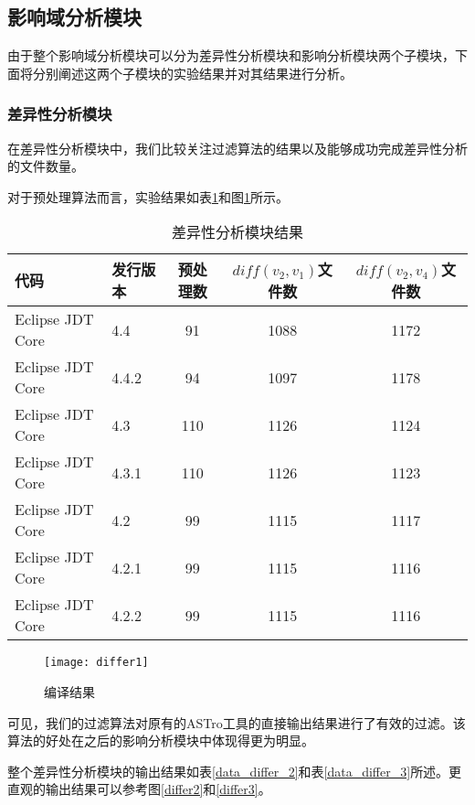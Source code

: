 \subsection{影响域分析模块}

由于整个影响域分析模块可以分为差异性分析模块和影响分析模块两个子模块，下面将分别阐述这两个子模块的实验结果并对其结果进行分析。

\subsubsection{差异性分析模块}

在差异性分析模块中，我们比较关注过滤算法的结果以及能够成功完成差异性分析的文件数量。

对于预处理算法而言，实验结果如表\ref {data_differ_1}和图\ref {differ1}所示。

\begin{table}[H]
	\caption{差异性分析模块结果}
	\label{data_differ_1}
	\centering
	\begin{tabular}{llccc}
		\toprule[1.5pt]
		{\heiti 代码} & {\heiti 发行版本} & {\heiti 预处理数} & {\heiti $diff(v_2,v_1)$文件数} & {\heiti $diff(v_2,v_4)$文件数} \\\midrule[1pt]
		Eclipse JDT Core & 4.4	& 91 & 1088 & 1172	\\		
		Eclipse JDT Core & 4.4.2 & 94 & 1097 & 1178		\\
		Eclipse JDT Core & 4.3 	& 110 & 1126 & 1124			\\
		Eclipse JDT Core & 4.3.1 & 110 & 1126 & 1123			\\
		Eclipse JDT Core & 4.2 	& 99 & 1115 & 1117		\\
		Eclipse JDT Core & 4.2.1 & 99 & 1115 & 1116			\\
		Eclipse JDT Core & 4.2.2 & 99 & 1115 & 1116		\\
		\bottomrule[1.5pt]
	\end{tabular}
\end{table}

\begin{figure}[H]
	\centering
	\texttt{[image: differ1]}
	\caption {编译结果}
	\label {differ1}	
\end{figure}

可见，我们的过滤算法对原有的ASTro工具的直接输出结果进行了有效的过滤。该算法的好处在之后的影响分析模块中体现得更为明显。

整个差异性分析模块的输出结果如表\ref {data_differ_2}和表\ref {data_differ_3}所述。更直观的输出结果可以参考图\ref {differ2}和\ref {differ3}。

